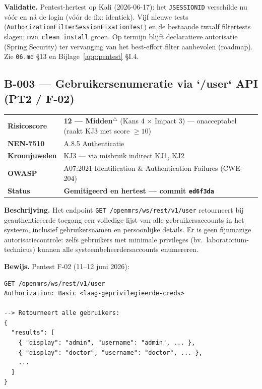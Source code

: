 \documentclass[12pt, a4paper]{report}
\newcommand{\amber}[1]{\textcolor{ragAmber}{\textbf{#1}}}
\newcommand{\groen}[1]{\textcolor{ragGreen}{\textbf{#1}}}
\begin{document}
\textbf{Validatie.} Pentest-hertest op Kali (2026-06-17): het \texttt{JSESSIONID}
verschilde nu vóór en ná de login (vóór de fix: identiek). Vijf nieuwe tests
(\texttt{AuthorizationFilterSessionFixationTest}) en de bestaande twaalf
filtertests slagen; \texttt{mvn clean install} groen. Op termijn blijft
declaratieve autorisatie (Spring Security) ter vervanging van het best-effort
filter aanbevolen (roadmap). Zie \texttt{06.md} \S13 en Bijlage~\ref{app:pentest} \S I.4.

\subsection{B-003 --- Gebruikersenumeratie via `/user` API (PT2 / F-02)}
\label{sec:b003}

\begin{tabular}{@{}l >{\raggedright\arraybackslash}p{11.4cm}@{}}
\textbf{Risicoscore} & \amber{12 --- Midden}$^\triangle$ (Kans 4 $\times$ Impact 3) --- onacceptabel (raakt KJ3 met score $\geq 10$) \\
\textbf{NEN-7510}    & A.8.5 Authenticatie \\
\textbf{Kroonjuwelen}& KJ3 --- via misbruik indirect KJ1, KJ2 \\
\textbf{OWASP}       & A07:2021 Identification \& Authentication Failures (CWE-204) \\
\textbf{Status}      & \groen{Gemitigeerd en hertest --- commit \texttt{ed6f3da}} \\
\end{tabular}

\textbf{Beschrijving.} Het endpoint \texttt{GET /openmrs/ws/rest/v1/user}
retourneert bij geauthenticeerde toegang een volledige lijst van alle
gebruikersaccounts in het systeem, inclusief gebruikersnamen en persoonlijke
details. Er is geen fijnmazige autorisatiecontrole: zelfs gebruikers met minimale
privileges (bv.\ laboratorium-technicus) kunnen alle systeembeheerdersaccounts
enumereren.

\textbf{Bewijs.} Pentest F-02 (11--12 juni 2026):
\begin{lstlisting}[basicstyle=\ttfamily\scriptsize, breaklines=true, frame=single]
GET /openmrs/ws/rest/v1/user
Authorization: Basic <laag-geprivilegieerde-creds>

--> Retourneert alle gebruikers:
{
  "results": [
    { "display": "admin", "username": "admin", ... },
    { "display": "doctor", "username": "doctor", ... },
    ...
  ]
}
\end{lstlisting}
\end{document}
